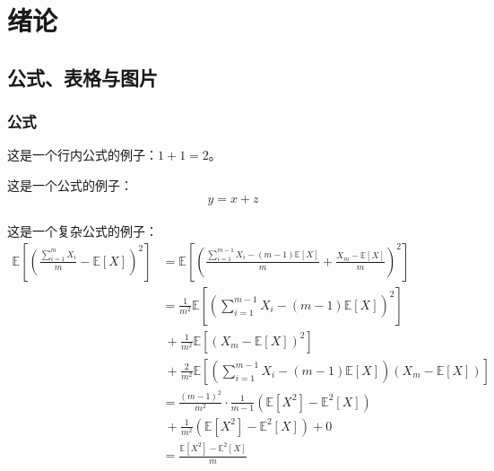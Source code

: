 \chapter{绪论}
    \section{公式、表格与图片}
	
	\subsection{公式}
这是一个行内公式的例子：$1+1=2$。\par
这是一个公式的例子：
\begin{equation}\label{eq1-1}
y=x+z\tag{1.1}
\end{equation}\\
这是一个复杂公式的例子：
$$
\begin{aligned}
\mathbb{E}\left[\left(\frac{\sum_{i=1}^m X_i}{m} -\mathbb{E}[X]\right)^2\right]&=\mathbb{E}\left[\left(\frac{\sum_{i=1}^{m-1} X_i-(m-1)\mathbb{E}[X]}{m} +\frac{X_m-\mathbb{E}[X]}{m}\right)^2\right]\\
&=\frac{1}{m^2}\mathbb E\left[\left(\sum_{i=1}^{m-1} X_i-(m-1)\mathbb{E}[X]\right)^2\right]\label{1.2}\\
&\ + \frac{1}{m^2} \mathbb{E}[(X_m-\mathbb{E}[X])^2]\\
&\ +\frac{2}{m^2}\mathbb{E}\left[\left(\sum_{i=1}^{m-1} X_i-(m-1)\mathbb{E}[X]\right)(X_m-\mathbb{E}[X]) \right]\\
&=\frac{(m-1)^2}{m^2}\cdot\frac 1{m-1}(\mathbb{E}[X^2]-\mathbb{E}^2[X])\\
&\ +\frac{1}{m^2}(\mathbb{E}[X^2]-\mathbb{E}^2[X])+0\\
&=\frac{\mathbb{E}[X^2]-\mathbb{E}^2[X]}{m}
\end{aligned}
$$

    